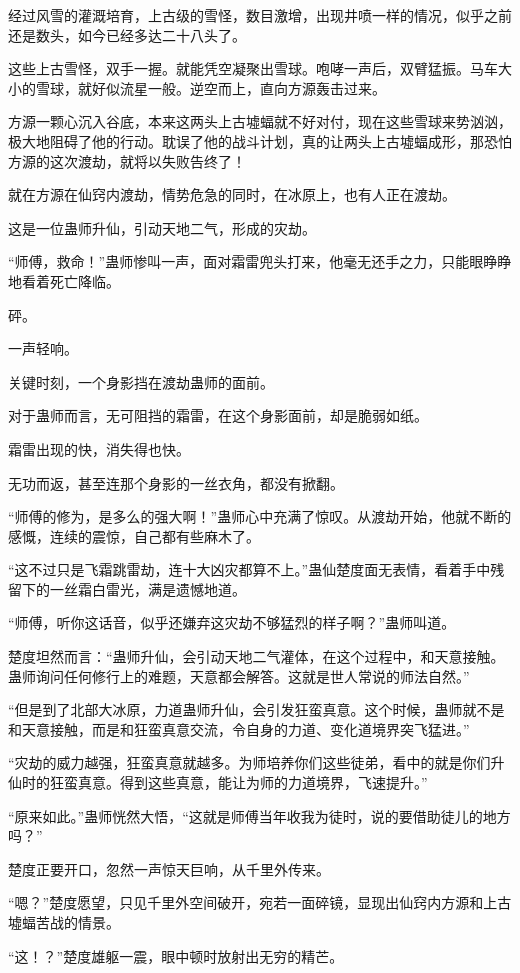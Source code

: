 \begin{this_body}
经过风雪的灌溉培育，上古级的雪怪，数目激增，出现井喷一样的情况，似乎之前还是数头，如今已经多达二十八头了。

这些上古雪怪，双手一握。就能凭空凝聚出雪球。咆哮一声后，双臂猛振。马车大小的雪球，就好似流星一般。逆空而上，直向方源轰击过来。

方源一颗心沉入谷底，本来这两头上古墟蝠就不好对付，现在这些雪球来势汹汹，极大地阻碍了他的行动。耽误了他的战斗计划，真的让两头上古墟蝠成形，那恐怕方源的这次渡劫，就将以失败告终了！

就在方源在仙窍内渡劫，情势危急的同时，在冰原上，也有人正在渡劫。

这是一位蛊师升仙，引动天地二气，形成的灾劫。

“师傅，救命！”蛊师惨叫一声，面对霜雷兜头打来，他毫无还手之力，只能眼睁睁地看着死亡降临。

砰。

一声轻响。

关键时刻，一个身影挡在渡劫蛊师的面前。

对于蛊师而言，无可阻挡的霜雷，在这个身影面前，却是脆弱如纸。

霜雷出现的快，消失得也快。

无功而返，甚至连那个身影的一丝衣角，都没有掀翻。

“师傅的修为，是多么的强大啊！”蛊师心中充满了惊叹。从渡劫开始，他就不断的感慨，连续的震惊，自己都有些麻木了。

“这不过只是飞霜跳雷劫，连十大凶灾都算不上。”蛊仙楚度面无表情，看着手中残留下的一丝霜白雷光，满是遗憾地道。

“师傅，听你这话音，似乎还嫌弃这灾劫不够猛烈的样子啊？”蛊师叫道。

楚度坦然而言：“蛊师升仙，会引动天地二气灌体，在这个过程中，和天意接触。蛊师询问任何修行上的难题，天意都会解答。这就是世人常说的师法自然。”

“但是到了北部大冰原，力道蛊师升仙，会引发狂蛮真意。这个时候，蛊师就不是和天意接触，而是和狂蛮真意交流，令自身的力道、变化道境界突飞猛进。”

“灾劫的威力越强，狂蛮真意就越多。为师培养你们这些徒弟，看中的就是你们升仙时的狂蛮真意。得到这些真意，能让为师的力道境界，飞速提升。”

“原来如此。”蛊师恍然大悟，“这就是师傅当年收我为徒时，说的要借助徒儿的地方吗？”

楚度正要开口，忽然一声惊天巨响，从千里外传来。

“嗯？”楚度愿望，只见千里外空间破开，宛若一面碎镜，显现出仙窍内方源和上古墟蝠苦战的情景。

“这！？”楚度雄躯一震，眼中顿时放射出无穷的精芒。

\end{this_body}

